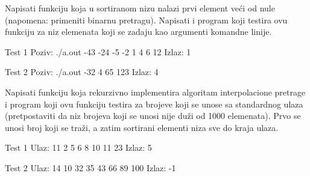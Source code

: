 \begin{Exercise}[label=403]
  Napisati funkciju koja u sortiranom nizu nalazi prvi element veći
  od nule (napomena: primeniti binarnu pretragu). Napisati i program
  koji testira ovu funkciju za niz elemenata koji se zadaju kao
  argumenti komandne linije.
  
\begin{miditest}
\begin{test}{Test 1}
Poziv:  ./a.out -43 -24 -5 -2 1 4 6 12
Izlaz:  1
\end{test}
\end{miditest}

\begin{miditest}
\begin{test}{Test 2}
Poziv:  ./a.out -32 4 65 123
Izlaz:  4
\end{test}
\end{miditest}
  
\end{Exercise}

\begin{Exercise}[label=404]
  Napisati funkciju koja rekurzivno implementira algoritam
  interpolacione pretrage i program koji ovu funkciju testira za
  brojeve koji se unose sa standardnog ulaza (pretpostaviti da niz
  brojeva koji se unosi nije duži od 1000 elemenata). Prvo se
  unosi broj koji se traži, a zatim sortirani elementi niza sve do
  kraja ulaza.
  
\begin{miditest}
\begin{test}{Test 1}
Ulaz:   11 2 5 6 8 10 11 23
Izlaz:  5
\end{test}
\end{miditest}

\begin{miditest}
\begin{test}{Test 2}
Ulaz:   14 10 32 35 43 66 89 100
Izlaz:  -1  
\end{test}
\end{miditest}
  
\end{Exercise}

